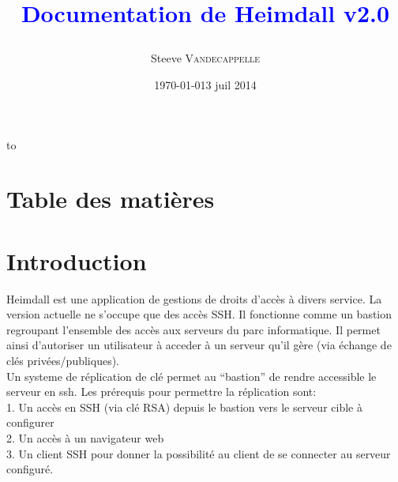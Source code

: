 \documentclass[11pt]{template}
\date{\today}
\author{}
\title{}
\title{\begin{Huge}\textcolor{blue}{Documentation de Heimdall v2.0}\end{Huge}}
\author{Steeve \textsc{Vandecappelle}}
\date{3 juil 2014}
\makeatletter
\def\clap#1{\hbox to 0pt{\hss #1\hss}}%
\def\ligne#1{%
  \hbox to \hsize{%
    \vbox{\centering #1}}}%
\def\haut#1#2#3#4{%
  \hbox to \hsize{%
    \rlap{\vtop{\centering #1}}%
    \rlap{\vtop{\centering #2}}%
    \clap{\vtop{\centering #3}}%
    \llap{\vtop{\centering #4}}}}%
\def\bas#1#2#3{%
  \hbox to \hsize{%
    \rlap{\vbox{\raggedright #1}}%
    \hss
    \clap{\vbox{\centering #2}}%
    \hss
    \llap{\vbox{\raggedleft #3}}}}%
\def\maketitle{%
  \thispagestyle{empty}\vbox to \vsize{%
    \haut{}{\@blurb}{}
    \vfill
    \vspace{4cm}
    \ligne{\Large \@title}
    \vspace{5mm}
    \ligne{\Large \@author}
    \vspace{1cm}
    \vfill
    \vfill
    \bas{}{\hspace{20mm} \@licence\newline}{}
  }%
  \cleardoublepage
}
\makeatother
\begin{document}
\maketitle
\newpage
\strut
\newpage
\startcontents[sections]
\section*{Table des matières} 
\newpage

\section{Introduction}
Heimdall est une application de gestions de droits d'accès à divers service. La version actuelle ne s'occupe que des accès SSH.
Il fonctionne comme un bastion regroupant l'ensemble des accès aux serveurs du parc informatique. Il permet ainsi d'autoriser un utilisateur à acceder à un serveur qu'il gère (via échange de clés privées/publiques).
\\\vspace{2mm}
Un systeme de réplication de clé permet au ``bastion'' de rendre accessible le serveur en ssh.
\vspace{15mm}
Les prérequis pour permettre la réplication sont:\\
1. Un accès en SSH (via clé RSA) depuis le bastion vers le serveur cible à configurer\\
2. Un accès à un navigateur web\\
3. Un client SSH pour donner la possibilité au client de se connecter au serveur configuré.

\newpage
\end{document}
